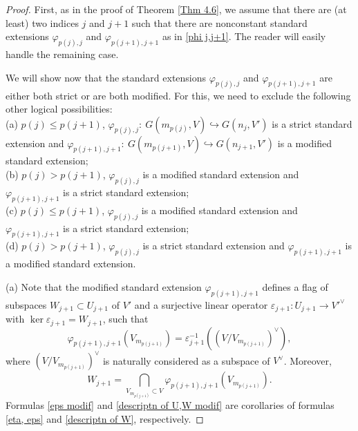 \documentclass[12pt]{amsart}
\renewcommand{\phi}{\varphi}
\theoremstyle{definition}
\begin{document}
\begin{proof}
First, as in the proof of Theorem \ref{Thm 4.6}, we assume 
that there are (at least) two indices $j$ 
and $j+1$ such that there are nonconstant standard extensions 
$\phi_{p(j),j}$ and $\phi_{p(j+1),j+1}$ as in \eqref{phi 
j,j+1}. The reader will easily handle the remaining case. 

We will show now that the standard extensions    
$\phi_{p(j),j}$ and $\phi_{p(j+1),j+1}$ are either both strict 
or are both modified. For this, we need to exclude the following other logical possibilities:\\
(a) $p(j)\le p(j+1)$, $\phi_{p(j),j}:\ G(m_{p(j)},V)
\hookrightarrow G(n_j,V')$ is a strict standard extension and 
$\phi_{p(j+1),j+1}:\ G(m_{p(j+1)},V)\hookrightarrow G(n_{j+1},
V')$ is a modified standard extension; \\
(b) $p(j)>p(j+1)$, $\phi_{p(j),j}$ is a modified standard 
extension and $\phi_{p(j+1),j+1}$ is a strict standard 
extension; \\ 
(c) $p(j)\le p(j+1)$, $\phi_{p(j),j}$ is a modified 
standard extension and $\phi_{p(j+1),j+1}$ is a strict 
standard extension; \\
(d) $p(j)>p(j+1)$, $\phi_{p(j),j}$ is a strict standard 
extension and $\phi_{p(j+1),j+1}$ is a modified standard 
extension. 

(a) Note that the modified standard extension $\phi_{p(j+1),
j+1}$ defines a flag of subspaces $W_{j+1}\subset U_{j+1}$ of 
$V'$ and a surjective linear operator
$\varepsilon_{j+1}:U_{j+1}\to V'^{\vee}$ with $\ker
\varepsilon_{j+1}=W_{j+1}$, such that 
\begin{equation}\label{eps modif}
\varphi_{p(j+1),j+1}(V_{m_{p(j+1)}})=\varepsilon_{j+1}^{-1}
((V/V_{m_{p(j+1)}})^{\vee}),
\end{equation} 
where $(V/V_{m_{p(j+1)}})^{\vee}$ is naturally considered as a 
subspace of $V^{\vee}$. Moreover,
\begin{equation}\label{descriptn  of U,W modif}
W_{j+1}=\underset{V_{m_{p(j+1)}}\subset V}{\bigcap} 
\varphi_{p(j+1),j+1}(V_{m_{p(j+1)}}).
\end{equation}
Formulas \eqref{eps modif} and \eqref{descriptn  of U,W modif} are corollaries of formulas \eqref{eta, eps} and 
\eqref{descriptn  of W}, respectively.


\end{proof}
\end{document}
